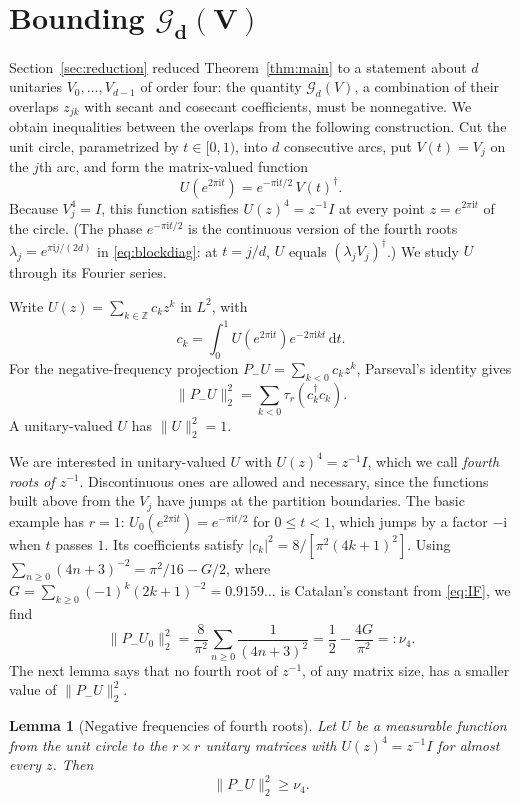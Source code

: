 \documentclass[aps,prl,reprint,superscriptaddress,longbibliography,floatfix,raggedbottom]{revtex4-2}
\newtheorem{lemma}{Lemma}
\newcommand{\Z}{\mathbb Z}
\newcommand{\ii}{\mathrm i}
\newcommand{\dd}{\,\mathrm d}
\newcommand{\norm}[1]{\lVert #1\rVert}
\newcommand{\abs}[1]{\lvert #1\rvert}
\newcommand{\tr}{\tau}
\newcommand{\Gcat}{G}
\newcommand{\Gd}{\mathcal G_d}
\begin{document}
\section{Bounding \texorpdfstring{$\boldsymbol{\Gd(V)}$}{G\_d(V)}}
\label{sec:partition}

Section~\ref{sec:reduction} reduced Theorem~\ref{thm:main} to a
statement about $d$ unitaries $V_0,\dots,V_{d-1}$ of order four: the
quantity $\Gd(V)$, a combination of their overlaps $z_{jk}$ with secant
and cosecant coefficients, must be nonnegative. We obtain inequalities
between the overlaps from the following construction. Cut the unit
circle, parametrized by $t\in[0,1)$, into $d$ consecutive arcs, put
$V(t)=V_j$ on the $j$th arc, and form the matrix-valued function
\[
U(e^{2\pi\ii t})=e^{-\pi\ii t/2}\,V(t)^\dagger .
\]
Because $V_j^4=I$, this function satisfies $U(z)^4=z^{-1}I$ at every
point $z=e^{2\pi\ii t}$ of the circle. (The phase $e^{-\pi\ii t/2}$ is
the continuous version of the fourth roots $\lambda_j=e^{\pi\ii j/(2d)}$
in \eqref{eq:blockdiag}: at $t=j/d$, $U$ equals $(\lambda_jV_j)^\dagger$.)
We study $U$ through its Fourier series.

Write $U(z)=\sum_{k\in\Z}c_kz^k$ in $L^2$, with
\[
c_k=\int_0^1U(e^{2\pi\ii t})e^{-2\pi\ii kt}\dd t .
\]
For the negative-frequency projection $P_-U=\sum_{k<0}c_kz^k$,
Parseval's identity gives
\[
\norm{P_-U}_2^2=\sum_{k<0}\tr_r(c_k^\dagger c_k).
\]
A unitary-valued $U$ has $\norm U_2^2=1$.

We are interested in unitary-valued $U$ with $U(z)^4=z^{-1}I$, which we
call \emph{fourth roots of $z^{-1}$}. Discontinuous ones are allowed
and necessary, since the functions built above from the $V_j$ have jumps at the partition
boundaries. The basic example has $r=1$:
$U_0(e^{2\pi\ii t})=e^{-\pi\ii t/2}$ for $0\le t<1$, which jumps by a
factor $-\ii$ when $t$ passes $1$. Its coefficients satisfy
$\abs{c_k}^2=8/[\pi^2(4k+1)^2]$. Using
$\sum_{n\ge0}(4n+3)^{-2}=\pi^2/16-\Gcat/2$, where
$\Gcat=\sum_{k\ge0}(-1)^k(2k+1)^{-2}=0.9159\ldots$ is Catalan's
constant from \eqref{eq:IF}, we find
\begin{equation}\label{eq:nu4}
\norm{P_-U_0}_2^2
=\frac8{\pi^2}\sum_{n\ge0}\frac1{(4n+3)^2}
=\frac12-\frac{4\Gcat}{\pi^2}=:\nu_4 .
\end{equation}
The next lemma says that no fourth root of $z^{-1}$, of any matrix
size, has a smaller value of $\norm{P_-U}_2^2$.

\begin{lemma}[Negative frequencies of fourth roots]\label{lem:hardy}
Let $U$ be a measurable function from the unit circle to the
$r\times r$ unitary matrices with $U(z)^4=z^{-1}I$ for almost every
$z$. Then
\begin{equation}\label{eq:Hardy}
\norm{P_-U}_2^2\ge\nu_4 .
\end{equation}
\end{lemma}
\end{document}
